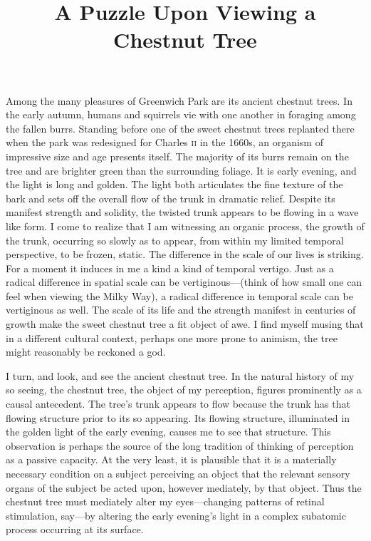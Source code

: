\documentclass[12pt]{article}
\title{A Puzzle Upon Viewing a Chestnut Tree}
\author{\myauthor}
\date{} %
\begin{document}
\maketitle

\setlength{\parindent}{1em}



Among the many pleasures of Greenwich Park are its ancient chestnut trees. In the early autumn, humans and squirrels vie with one another in foraging among the fallen burrs. Standing before one of the sweet chestnut trees replanted there when the park was redesigned for Charles \textsc{ii} in the 1660s, an organism of impressive size and age presents itself. The majority of its burrs remain on the tree and are brighter green than the surrounding foliage. It is early evening, and the light is long and golden. The light both articulates the fine texture of the bark and sets off the overall flow of the trunk in dramatic relief. Despite its manifest strength and solidity, the twisted trunk appears to be flowing in a wave like form. I come to realize that I am witnessing an organic process, the growth of the trunk, occurring so slowly as to appear, from within my limited temporal perspective, to be frozen, static. The difference in the scale of our lives is striking. For a moment it induces in me a kind a kind of temporal vertigo.  Just as a radical difference in spatial scale can be vertiginous---(think of how small one can feel when viewing the Milky Way), a radical difference in temporal scale can be vertiginous as well. The scale of its life and the strength manifest in centuries of growth make the sweet chestnut tree a fit object of awe. I find myself musing that in a different cultural context, perhaps one more prone to animism, the tree might reasonably be reckoned a god. 

I turn, and look, and see the ancient chestnut tree. In the natural history of my so seeing, the chestnut tree, the object of my perception, figures prominently as a causal antecedent. The tree's trunk appears to flow because the trunk has that flowing structure prior to its so appearing. Its flowing structure, illuminated in the golden light of the early evening, causes me to see that structure. This observation is perhaps the source of the long tradition of thinking of perception as a passive capacity. At the very least, it is plausible that it is a materially necessary condition on a subject perceiving an object that the relevant sensory organs of the subject be acted upon, however mediately, by that object. Thus the chestnut tree must mediately alter my eyes---changing patterns of retinal stimulation, say---by altering the early evening's light in a complex subatomic process occurring at its surface.
\end{document}
